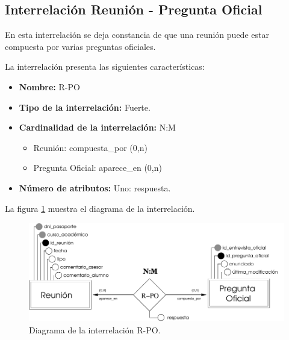 \subsection{Interrelación Reunión - Pregunta Oficial}

   \begin{description}
      \item[Definición] En esta interrelación se deja constancia de que una
      reunión puede estar compuesta por varias preguntas oficiales.

      \item[Características] La interrelación presenta las siguientes
                             características:

         \begin{itemize}
            \item \textbf{Nombre:} R-PO
            \item \textbf{Tipo de la interrelación:} Fuerte.
            \item \textbf{Cardinalidad de la interrelación:} N:M
                  \begin{itemize}
                     \item Reunión: compuesta\_por (0,n)
                     \item Pregunta Oficial: aparece\_en (0,n)
                  \end{itemize}
            \item \textbf{Número de atributos:} Uno: respuesta.
         \end{itemize}

      \item[Diagrama] La figura \ref{diagramaR-PO} muestra el diagrama de la
                      interrelación.

      \item \begin{figure}[!ht]
            \begin{center}
            \includegraphics[]{07.Modelo_Entidad-Interrelacion/7.3.Analisis_Interrelaciones/diagramas/R-PO.pdf}
            \caption{Diagrama de la interrelación R-PO.}
            \label{diagramaR-PO}
            \end{center}
         \end{figure}


\end{description}
